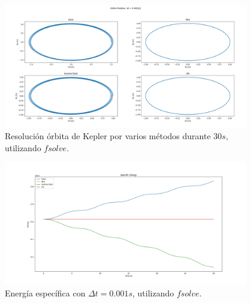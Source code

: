 \documentclass[12pt,a4paper]{article}
\begin{document}
\begin{figure}[H] 
	\centering
	\includegraphics[width=0.95\textwidth]{FIGURES/dt0.001_fsolve_pos.png}
	\caption{Resolución órbita de Kepler por varios métodos durante 30$s$, utilizando $fsolve$.}
\end{figure}
\begin{figure}[H] 
	\centering
	\includegraphics[width=0.95\textwidth]{FIGURES/dt0.001_fsolve_energy.png}
	\caption{Energía específica con $\Delta t = 0.001 s$, utilizando $fsolve$.}
\end{figure}
\end{document}
